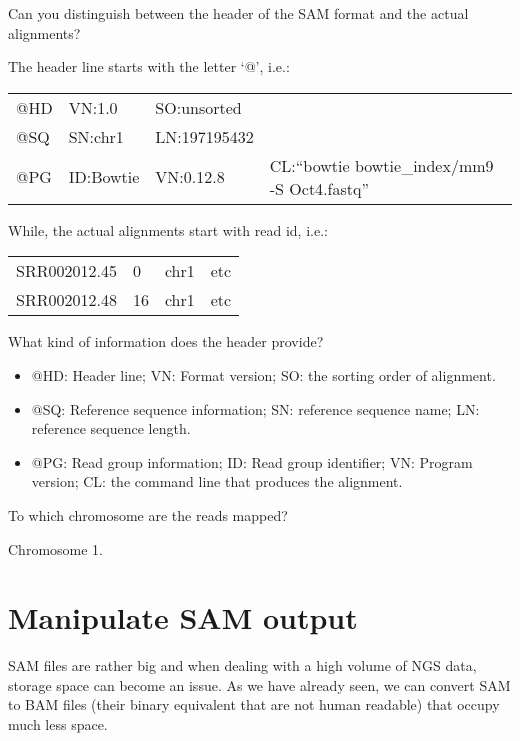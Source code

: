 \begin{questions}
Can you distinguish between the header of the SAM format and the actual alignments?
\begin{answer}
The header line starts with the letter `@', i.e.: 

\begin{tabular}{llll}
@HD & VN:1.0 & SO:unsorted & \\
@SQ & SN:chr1 & LN:197195432 & \\
@PG & ID:Bowtie &      VN:0.12.8  & CL:``bowtie bowtie\_index/mm9 -S Oct4.fastq'' \\
\end{tabular}

While, the actual alignments start with read id, i.e.:

\begin{tabular}{llll}
SRR002012.45 & 0 & chr1 & etc \\
SRR002012.48 & 16 & chr1 & etc \\
\end{tabular}
\end{answer}

What kind of information does the header provide?
\begin{answer}
\begin{itemize}
  \item @HD: Header line; VN: Format version; SO: the sorting order of alignment.
  \item @SQ: Reference sequence information; SN: reference sequence name; LN: reference sequence length.
  \item @PG: Read group information; ID: Read group identifier; VN: Program version; CL: the command line that produces the alignment.
\end{itemize}
\end{answer}

To which chromosome are the reads mapped? 
\begin{answer}
Chromosome 1.
\end{answer}
\end{questions}

\section{Manipulate SAM output}

\begin{note}
SAM files are rather big and when dealing with a high volume of NGS data,
storage space can become an issue. As we have already seen, we can convert SAM
to BAM files (their binary equivalent that are not human readable) that occupy
much less space.
\end{note}

